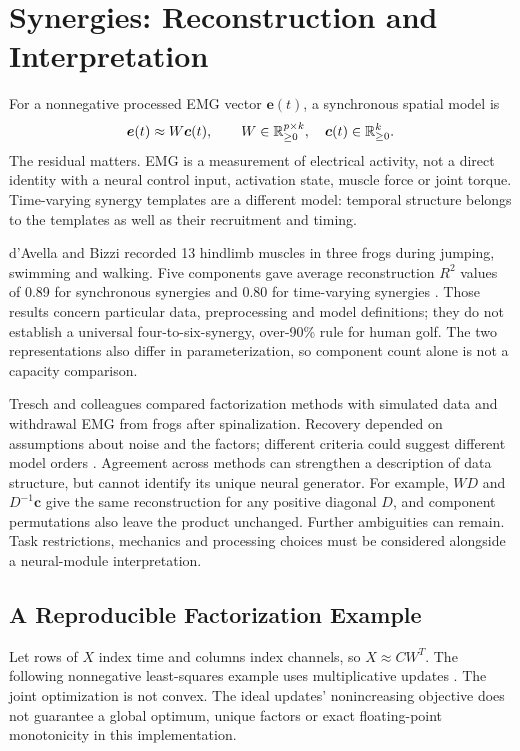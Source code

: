\section{Synergies: Reconstruction and Interpretation}

For a nonnegative processed EMG vector $\bm e(t)$, a synchronous spatial model is
\begin{equation}
 \bm e(t)\approx W\bm c(t),\qquad
 W\in\mathbb{R}_{\geq0}^{p\times k},\quad
 \bm c(t)\in\mathbb{R}_{\geq0}^{k}.
 \label{eq:ch4:synergy-decomposition}
\end{equation}
The residual matters. EMG is a measurement of electrical activity, not a direct
identity with a neural control input, activation state, muscle force or joint
torque. Time-varying synergy templates are a different model: temporal structure
belongs to the templates as well as their recruitment and timing.

d'Avella and Bizzi recorded 13 hindlimb muscles in three frogs during jumping,
swimming and walking. Five components gave average reconstruction $R^2$ values
of 0.89 for synchronous synergies and 0.80 for time-varying synergies
\cite{dAvellaBizzi2005}. Those results concern particular data, preprocessing
and model definitions; they do not establish a universal four-to-six-synergy,
over-90\% rule for human golf. The two representations also differ in
parameterization, so component count alone is not a capacity comparison.

Tresch and colleagues compared factorization methods with simulated data and
withdrawal EMG from frogs after spinalization. Recovery depended on assumptions about noise
and the factors; different criteria could suggest different model orders
\cite{Tresch2006}. Agreement across methods can strengthen a description of
data structure, but cannot identify its unique neural generator. For example,
$W D$ and $D^{-1}\bm c$ give the same reconstruction for any positive diagonal
$D$, and component permutations also leave the product unchanged. Further
ambiguities can remain. Task restrictions, mechanics and processing choices
must be considered alongside a neural-module interpretation.

\subsection{A Reproducible Factorization Example}

Let rows of $X$ index time and columns index channels, so $X\approx CW^T$.
The following nonnegative least-squares example uses multiplicative updates
\cite{leeSeung2000review}. The joint optimization is not convex. The ideal
updates' nonincreasing objective does not guarantee a global optimum, unique
factors or exact floating-point monotonicity in this implementation.

